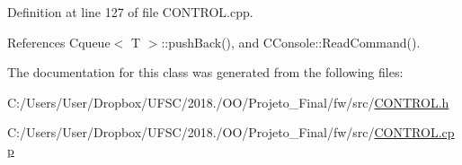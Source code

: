 Definition at line 127 of file C\+O\+N\+T\+R\+O\+L.\+cpp.



References Cqueue$<$ T $>$\+::push\+Back(), and C\+Console\+::\+Read\+Command().



The documentation for this class was generated from the following files\+:\begin{DoxyCompactItemize}
\item 
C\+:/\+Users/\+User/\+Dropbox/\+U\+F\+S\+C/2018./\+O\+O/\+Projeto\+\_\+\+Final/fw/src/\mbox{\hyperlink{_c_o_n_t_r_o_l_8h}{C\+O\+N\+T\+R\+O\+L.\+h}}\item 
C\+:/\+Users/\+User/\+Dropbox/\+U\+F\+S\+C/2018./\+O\+O/\+Projeto\+\_\+\+Final/fw/src/\mbox{\hyperlink{_c_o_n_t_r_o_l_8cpp}{C\+O\+N\+T\+R\+O\+L.\+cpp}}\end{DoxyCompactItemize}
